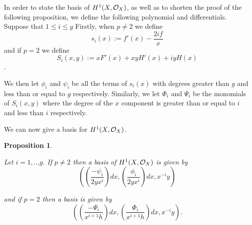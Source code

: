 \documentclass[draft, 11pt]{article} %
\theoremstyle{plain}
\newtheorem{prop}[defn]{Proposition}
\theoremstyle{remark}
\newcommand{\cO}{{\cal O}}
\begin{document}
In order to state the basis of $H^1(X,\cO_X)$, as well as to shorten the proof of the following proposition, we define the following polynomial and differentials.
Suppose that $1 \leq i \leq g$
Firstly, when $p\neq 2$ we define 
\[
	s_i(x) := f'(x) - \frac{2if}{x}
\]
and if $p = 2$ we define
\[
	S_i(x,y) := xF'(x) + xyH'(x) + iyH(x)
\].

We then let $\phi_i$ and $\psi_i$ be all the terms of $s_i(x)$ with degrees greater than $g$ and less than or equal to $g$ respectively.
Similarly, we let $\Phi_i$ and $\Psi_i$ be the monomials of $S_i(x,y)$ where the degree of the $x$ component is greater than or equal to $i$ and less than $i$ respectively.

We can now give a basis for $H^1(X,\cO_X)$.\\

\begin{prop}\label{basis}

Let $i=1,\ldots g$. If $p\neq 2$ then a basis of $H^1(X,\cO_X)$ is given by 
\[
	\left( \left( \frac{-\psi_i}{2yx^i}\right) dx, \left(\frac{\phi_i}{2yx^i}\right) dx, x^{-i}y\right)
\]

and if $p=2$ then a basis is given by
\[
	\left( \left(\frac{-\Psi_i}{x^{i+1}h}\right) dx, \left( \frac{\Phi_i}{x^{i+1}h} \right) dx, x^{-i}y \right).
\]
\end{prop}
\end{document}
